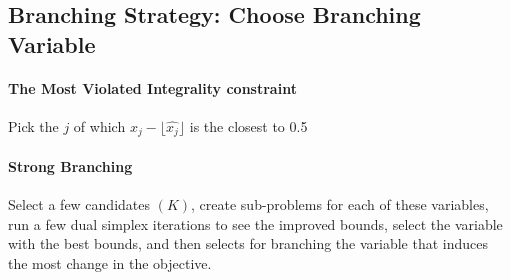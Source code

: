             \subsection{Branching Strategy: Choose Branching Variable}
                    
                \paragraph{The Most Violated Integrality constraint}
                    Pick the $j$ of which $x_j - \lfloor \hat{x_j} \rfloor$ is the closest to 0.5

                \paragraph{Strong Branching}
                    Select a few candidates $(K)$, create sub-problems for each of these variables, run a few dual simplex iterations to see the improved bounds, select the variable with the best bounds, and then selects for branching the variable that induces the most change in the objective.

